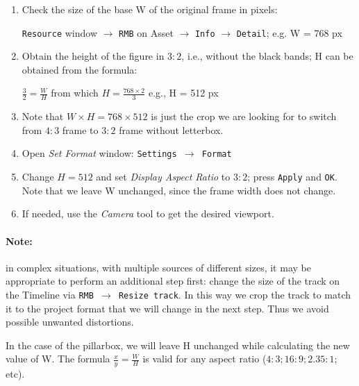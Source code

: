 \begin{enumerate}
    \item Check the size of the base W of the original frame in pixels:

    \texttt{Resource} window $\rightarrow$ \texttt{RMB} on Asset
$\rightarrow$ \texttt{Info} $\rightarrow$ \texttt{Detail}; e.g. W =
768 px
    \item Obtain the height of the figure in $3:2$, i.e., without the
black bands; H can be obtained from the formula:

    $\frac{3}{2} = \frac{W}{H}$ \quad from which $H = \frac{768 \times
2}{3}$ \qquad e.g., H = 512 px
    \item Note that $W \times H = 768 \times 512$ is just the crop we
are looking for to switch from $4:3$ frame to $3:2$ frame without
letterbox.
    \item Open \textit{Set Format} window: \texttt{Settings
$\rightarrow$ Format}
    \item Change $H = 512$ and set \textit{Display Aspect Ratio} to
$3:2$; press \texttt{Apply} and \texttt{OK}. Note that we leave W
unchanged, since the frame width does not change.
    \item If needed, use the \textit{Camera} tool to get the
desired viewport.
\end{enumerate}

\paragraph{Note:} in complex situations, with multiple sources of
different sizes, it may be appropriate to perform an additional
step first: change the size of the track on the Timeline via
\texttt{RMB $\rightarrow$ Resize track}.
In this way we crop the track to match it to the project format that
we will change in the next step. Thus we avoid possible unwanted
distortions.

In the case of the pillarbox, we will leave H unchanged while
calculating the new value of W. The formula $\frac{x}{y} =
\frac{W}{H}$ is valid for any aspect ratio ($4:3; 16:9; 2.35:1$; etc).
